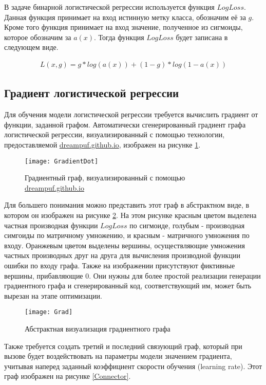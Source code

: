 В задаче бинарной логистической регрессии используется функция $LogLoss$. Данная функция принимает на вход истинную метку класса, обозначим её за $g$. Кроме того функция принимает на вход значение, полученное из сигмоиды, которое обозначим за $a(x)$. Тогда функция $LogLoss$ будет записана в следующем виде.

\begin{gather*}
L(x, g)=g*log(a(x)) + (1-g)*log(1-a(x))
\end{gather*}

\subsection{Градиент логистической регрессии}

Для обучения модели логистической регрессии требуется вычислить градиент от функции, заданной графом. Автоматически сгенерированный градиент графа логистической регрессии, визуализированный с помощью технологии, предоставляемой \href{https://dreampuf.github.io/GraphvizOnline}{dreampuf.github.io}, изображен на рисунке \ref{GradientDot}.

\begin{figure}[h]
    \centering
    \texttt{[image: GradientDot]}
    \caption{Градиентный граф, визуализированный с помощью \href{https://dreampuf.github.io/GraphvizOnline}{dreampuf.github.io}}
    \label{GradientDot}
\end{figure}

\clearpage
Для большего понимания можно представить этот граф в абстрактном виде, в котором он изображен на рисунке \ref{Grad}. На этом рисунке красным цветом выделена частная производная функции $LogLoss$ по сигмоиде, голубым - производная симгоиды по матричному умножению, и красным - матричного умножения по входу. Оранжевым цветом выделены вершины, осуществляющие умножения частных производных друг на друга для вычисления производной функции ошибки по входу графа. Также на изображении присутствуют фиктивные вершины, прибавляющие $0$. Они нужны для более простой реализации генерации градиентного графа и сгенерированный код, соответствующий им, может быть вырезан на этапе оптимизации.

\begin{figure}[h]
    \centering
    \texttt{[image: Grad]}
    \caption{Абстрактная визуализация градиентного графа}
    \label{Grad}
\end{figure}

\clearpage
Также требуется создать третий и последний связующий граф, который при вызове будет воздействовать на параметры модели значением градиента, учитывая наперед заданный коэффициент скорости обучения (learning rate). Этот граф изображен на рисунке \ref{Connector}.


